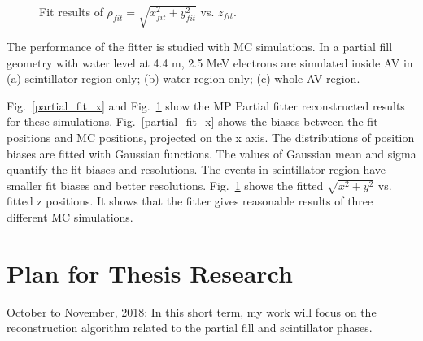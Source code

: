 \documentclass[preprint,12pt]{elsarticle}
\numberwithin{equation}{section}
\begin{document}
\begin{figure}[htbp]
{\begin{minipage}[t]{0.32\textwidth}
		\end{minipage}
	}
	\caption{Fit results of $\rho_{fit}=\sqrt{x_{fit}^2+y_{fit}^2}$ vs. $z_{fit}$.}
	\label{partial_fit_rz}
\end{figure}

The performance of the fitter is studied with MC simulations. In a partial fill geometry with water level at 4.4 m, 2.5 MeV electrons are simulated inside AV in (a) scintillator region only; (b) water region only; (c) whole AV region.

Fig.~\ref{partial_fit_x} and Fig.~\ref{partial_fit_rz} show the MP Partial fitter reconstructed results for these simulations. Fig.~\ref{partial_fit_x} shows the biases between the fit positions and MC positions, projected on the x axis. The distributions of position biases are fitted with Gaussian functions. The values of Gaussian mean and sigma quantify the fit biases and resolutions. The events in scintillator region have  smaller fit biases and better resolutions. Fig.~\ref{partial_fit_rz} shows the fitted $\sqrt{x^2+y^2}$ vs. fitted z positions. It shows that the fitter gives reasonable results of three different MC simulations. 


\section{Plan for Thesis Research}
October to November, 2018: In this short term, my work will focus on the reconstruction algorithm related to the partial fill and scintillator phases. 
\end{document}
